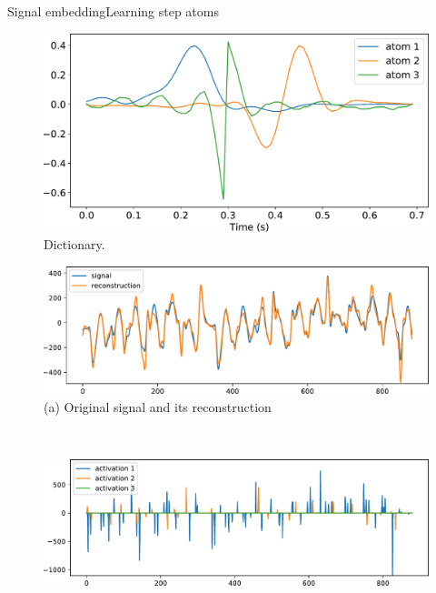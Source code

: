 \documentclass[9pt,t,aspectratio=1610]{beamer}
\newcommand{\ratio}{0.5}
\begin{document}
\begin{frame}{Signal embedding}{Learning step atoms}
\begin{minipage}[t]{0.45\linewidth}
    \centering
    \begin{figure}
    \includegraphics[width=0.85\linewidth]{dictionary.pdf}
    \caption{Dictionary.}
    \end{figure}
\end{minipage}
\begin{minipage}[t]{0.54\linewidth}
    \pause
    \begin{figure}
        \begin{minipage}{\linewidth}
            \centering
            \includegraphics[trim= 0 0 0 0, width=\ratio\linewidth, clip]{signal_walk_young_female_csc_1.pdf}\\
            {\small (a)\; Original signal and its reconstruction}
        \end{minipage}\\
        \begin{minipage}{\linewidth}
            \centering
            \includegraphics[trim= 0 0 0 0, width=\ratio\linewidth, clip]{signal_walk_young_female_csc_2.pdf}\\

\end{minipage}
\end{figure}
\end{minipage}
\end{frame}
\end{document}
